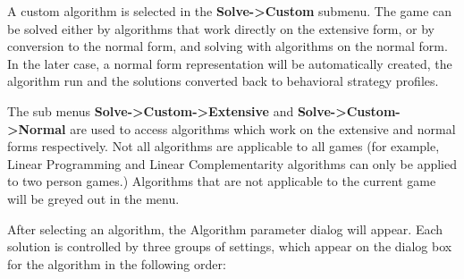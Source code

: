 A custom algorithm is selected in the {\bf Solve->Custom} submenu.
The game can be solved either by algorithms that work directly on the
extensive form, or by conversion to the normal form, and solving with
algorithms on the normal form.  In the later case, a normal form
representation will be automatically created, the algorithm run and
the solutions converted back to behavioral strategy profiles.

The sub menus {\bf Solve->Custom->Extensive} and {\bf 
Solve->Custom->Normal} are used to access algorithms which work on the
extensive and normal forms respectively.  Not all algorithms are
applicable to all games (for example, Linear Programming and Linear
Complementarity algorithms can only be applied to two person games.)
Algorithms that are not applicable to the current game will be greyed
out in the menu.

After selecting an algorithm, the Algorithm parameter dialog will
appear. Each solution is controlled by three groups of settings, which
appear on the dialog box for the algorithm in the following order:

